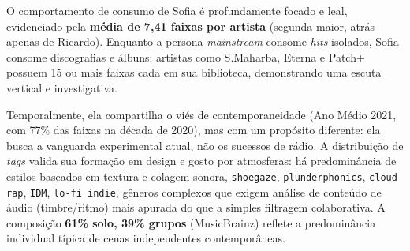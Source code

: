 \documentclass[12pt, %
openright,
oneside, %
a4paper,    %
english,   %
brazil]{facom-ufu-abntex2}
\begin{document}
O comportamento de consumo de Sofia é profundamente focado e leal, evidenciado
pela \textbf{média de 7,41 faixas por artista} (segunda maior, atrás apenas de
Ricardo). Enquanto a persona \emph{mainstream} consome \emph{hits} isolados,
Sofia consome discografias e álbuns: artistas como S.Maharba, Eterna e Patch+
possuem 15 ou mais faixas cada em sua biblioteca, demonstrando uma escuta
vertical e investigativa.

Temporalmente, ela compartilha o viés de contemporaneidade (Ano Médio 2021, com
77\% das faixas na década de 2020), mas com um propósito diferente: ela busca a
vanguarda experimental atual, não os sucessos de rádio. A distribuição de
\emph{tags} valida sua formação em design e gosto por atmosferas: há
predominância de estilos baseados em textura e colagem sonora, 
\texttt{shoegaze}, \texttt{plunderphonics}, \texttt{cloud rap}, \texttt{IDM},
\texttt{lo-fi indie}, gêneros complexos que exigem análise de conteúdo de
áudio (timbre/ritmo) mais apurada do que a simples filtragem colaborativa. A
composição \textbf{61\% solo, 39\% grupos} (MusicBrainz) reflete a predominância
individual típica de cenas independentes contemporâneas.
\end{document}
